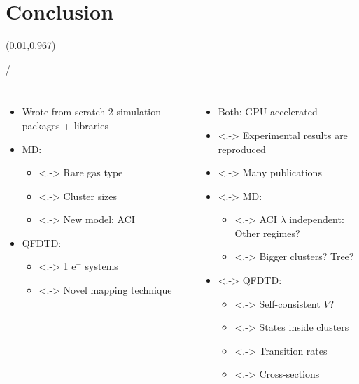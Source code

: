 \documentclass{beamer}
\makeatletter
\newcommand{\framenumber}{
\begin{textblock}{0}(0.01,0.967)
\begin{scriptsize}
{\color{gray}\insertframenumber/\inserttotalframenumber}
\end{scriptsize}
\end{textblock}
}
\makeatother
\begin{document}
\section{Conclusion}
\begin{frame}{}\framenumber

\begin{columns}[t]

    \begin{itemize}
    \item<+-> Wrote from scratch 2 simulation packages + libraries
    \item<+-> MD:
        \begin{itemize}
        \item<.-> Rare gas type
        \item<.-> Cluster sizes
        \item<.-> New model: ACI
        \end{itemize}
    \item<+-> QFDTD:
        \begin{itemize}
        \item<.-> 1 e$^{-}$ systems
        \item<.-> Novel mapping technique
        \end{itemize}
    \end{itemize}

    \begin{itemize}
    \item<+-> Both: GPU accelerated
    \item<.-> Experimental results are reproduced
    \item<.-> Many publications
    \item<.-> MD:
        \begin{itemize}
        \item<.-> ACI $\lambda$ independent: Other regimes?
        \item<.-> Bigger clusters? Tree?
        \end{itemize}
    \item<.-> QFDTD:
        \begin{itemize}
        \item<.-> Self-consistent $V$?
        \item<.-> States inside clusters
        \item<.-> Transition rates
        \item<.-> Cross-sections
        \end{itemize}
    \end{itemize}

\end{columns}
\end{frame}
\end{document}

